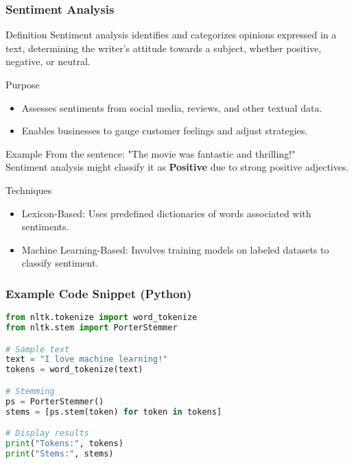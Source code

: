 \documentclass{beamer}
\begin{document}
\begin{frame}[fragile]
    \frametitle{Sentiment Analysis}
    \begin{block}{Definition}
        Sentiment analysis identifies and categorizes opinions expressed in a text, determining the writer’s attitude towards a subject, whether positive, negative, or neutral.
    \end{block}

    \begin{block}{Purpose}
        \begin{itemize}
            \item Assesses sentiments from social media, reviews, and other textual data.
            \item Enables businesses to gauge customer feelings and adjust strategies.
        \end{itemize}
    \end{block}

    \begin{block}{Example}
        From the sentence: "The movie was fantastic and thrilling!" \\
        Sentiment analysis might classify it as \textbf{Positive} due to strong positive adjectives.
    \end{block}

    \begin{block}{Techniques}
        \begin{itemize}
            \item Lexicon-Based: Uses predefined dictionaries of words associated with sentiments.
            \item Machine Learning-Based: Involves training models on labeled datasets to classify sentiment.
        \end{itemize}
    \end{block}
\end{frame}

\begin{frame}[fragile]
    \frametitle{Example Code Snippet (Python)}
    \begin{lstlisting}[language=Python]
from nltk.tokenize import word_tokenize
from nltk.stem import PorterStemmer

# Sample text
text = "I love machine learning!"
tokens = word_tokenize(text)

# Stemming
ps = PorterStemmer()
stems = [ps.stem(token) for token in tokens]

# Display results
print("Tokens:", tokens)
print("Stems:", stems)
    \end{lstlisting}
\end{frame}
\end{document}
